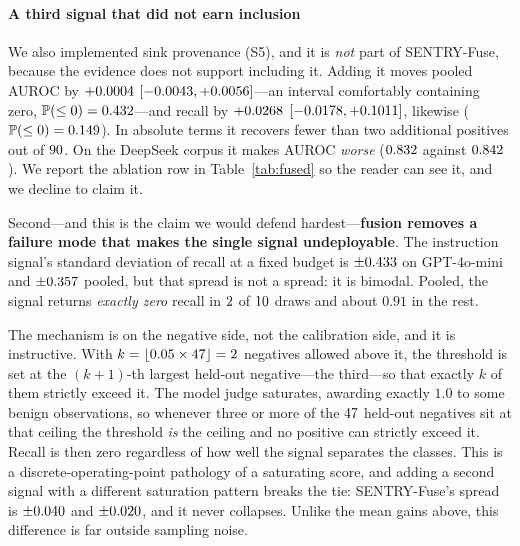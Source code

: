\documentclass[preprint,12pt,number]{elsarticle}
\theoremstyle{definition}
\newcommand{\Prob}{\mathbb{P}}
\begin{document}
\paragraph{A third signal that did not earn inclusion} We also implemented
sink provenance (S5), and it is \emph{not} part of SENTRY-Fuse, because the evidence
does not support including it. Adding it moves pooled AUROC by $+0.0004$
$[-0.0043, +0.0056]$---an interval comfortably containing zero,
$\Prob(\le 0) = \BootSfiveAurocP$---and recall by $+0.0268$
$[-0.0178, +0.1011]$, likewise ($\Prob(\le 0) = \BootSfiveTprP$). In
absolute terms it recovers fewer than two additional positives out of $90$. On
the DeepSeek corpus it makes AUROC \emph{worse} ($0.832$ against
$0.842$). We report the ablation row in Table~\ref{tab:fused} so the reader
can see it, and we decline to claim it.

Second---and this is the claim we would defend hardest---\textbf{fusion removes a
failure mode that makes the single signal undeployable}. The instruction signal's
standard deviation of recall at a fixed budget is $\pm 0.433$ on
GPT-4o-mini and $\pm 0.357$ pooled, but that spread is not a spread: it
is bimodal. Pooled, the signal returns \emph{exactly zero} recall in
$2$ of $10$ draws and about $0.91$ in the rest.

The mechanism is on the negative side, not the calibration side, and it is
instructive. With $k = \lfloor 0.05 \times 47 \rfloor = 2$ negatives allowed
above it, the threshold is set at the $(k+1)$-th largest held-out negative---the
third---so that exactly $k$ of them strictly exceed it. The model judge saturates,
awarding exactly $1.0$ to some benign observations, so whenever three or more of
the $47$ held-out negatives sit at that ceiling the threshold \emph{is} the
ceiling and no positive can strictly exceed it. Recall is then zero regardless of
how well the signal separates the classes. This is a discrete-operating-point
pathology of a saturating score, and adding a second signal with a different
saturation pattern breaks the tie: SENTRY-Fuse's spread is
$\pm 0.040$ and $\pm 0.020$, and it never collapses. Unlike the
mean gains above, this difference is far outside sampling noise.
\end{document}
